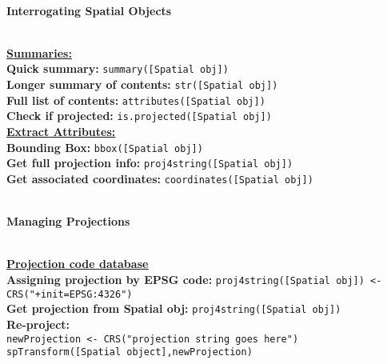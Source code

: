 \documentclass[10pt]{article}
\begin{document}
\hrulefill \\ 
\centerline{\textbf{Interrogating Spatial Objects}} \\
\underline{\textbf{Summaries:} }\\
\textbf{Quick summary:} \texttt{summary([Spatial obj])}\\
\textbf{Longer summary of contents:} \texttt{str([Spatial obj])}\\
\textbf{Full list of contents:} \texttt{attributes([Spatial obj])}\\
\textbf{Check if projected:} \texttt{is.projected([Spatial obj])}\\

\underline{\textbf{Extract Attributes:} }\\
\textbf{Bounding Box:} \texttt{bbox([Spatial obj])}\\
\textbf{Get full projection info:} \texttt{proj4string([Spatial obj])}\\
\textbf{Get associated coordinates:} \texttt{coordinates([Spatial obj])}\\


\hrulefill \\ 
\centerline{\textbf{Managing Projections}} \\
\href{http://www.spatialreference.org/}{\underline{\textbf{Projection code database}}} \\
\hspace{0.3cm}
\textbf{Assigning projection by EPSG code:} \texttt{proj4string([Spatial obj]) <-CRS("+init=EPSG:4326")}\\
\textbf{Get projection from Spatial obj:} \texttt{proj4string([Spatial obj])} \\
\textbf{Re-project:} \\
\hspace*{0.3cm}\texttt{newProjection <- CRS("projection string goes here")}\\
\hspace*{0.3cm}\texttt{spTransform([Spatial object],newProjection)}\\
\end{document}
